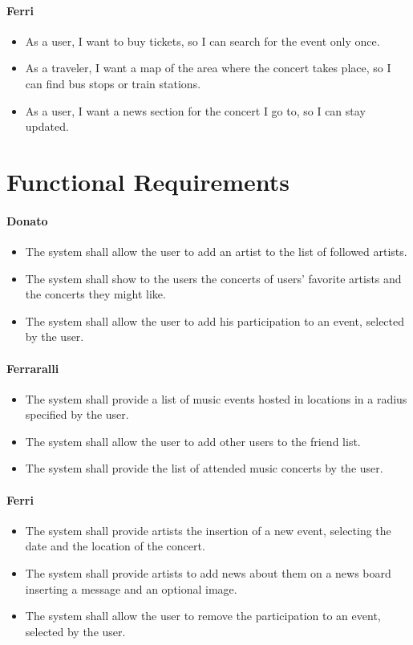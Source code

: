\documentclass[11pt,a4paper]{article}
\begin{document}
\paragraph{Ferri}
\begin{itemize}
\item As a user, I want to buy tickets, so I can search for the event only once.
\item As a traveler, I want a map of the area where the concert takes place, so I can
find bus stops or train stations. 
\item As a user, I want a news section for the concert I go to, so I can stay updated.
\end{itemize}
\section{Functional Requirements}
\paragraph{Donato}
\begin{itemize}
\item The system shall allow the user to add an artist to the list of followed artists.
\item The system shall show to the users the concerts of users’ favorite artists and the concerts they might like.
\item The system shall allow the user to add his participation to an event, selected by the user.
\end{itemize}
\paragraph{Ferraralli}
\begin{itemize}
\item The system shall provide a list of music events hosted in locations in a radius specified by the user.
\item The system shall allow the user to add other users to the friend list.
\item The system shall provide the list of attended music concerts by the user.
\end{itemize}
\paragraph{Ferri}
\begin{itemize}
\item The system shall provide artists the insertion of a new event, selecting the date and the location of the concert.
\item The system shall provide artists to add news about them on a news board inserting a message and an optional image.
\item The system shall allow the user to remove the participation to an event, selected by the user.
\end{itemize}
\end{document}
